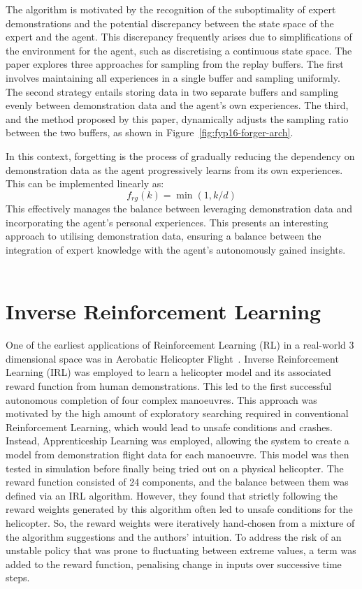 The algorithm is motivated by the recognition of the suboptimality of expert demonstrations and the potential discrepancy between the state space of the expert and the agent.
This discrepancy frequently arises due to simplifications of the environment for the agent, such as discretising a continuous state space.
The paper explores three approaches for sampling from the replay buffers.
The first involves maintaining all experiences in a single buffer and sampling uniformly.
The second strategy entails storing data in two separate buffers and sampling evenly between demonstration data and the agent's own experiences.
The third, and the method proposed by this paper, dynamically adjusts the sampling ratio between the two buffers, as shown in Figure~\ref{fig:fyp16-forger-arch}.

In this context, forgetting is the process of gradually reducing the dependency on demonstration data as the agent progressively learns from its own experiences.
This can be implemented linearly as: 
\[f_{rg}(k) = \min(1, k/d)\]
This effectively manages the balance between leveraging demonstration data and incorporating the agent's personal experiences.
This presents an interesting approach to utilising demonstration data, ensuring a balance between the integration of expert knowledge with the agent's autonomously gained insights. \\\\

\section{Inverse Reinforcement Learning}
One of the earliest applications of Reinforcement Learning (RL) in a real-world 3 dimensional space was in Aerobatic Helicopter Flight~\cite{abbeelRLAerobaticFlight}.
Inverse Reinforcement Learning (IRL) was employed to learn a helicopter model and its associated reward function from human demonstrations.
This led to the first successful autonomous completion of four complex manoeuvres.
This approach was motivated by the high amount of exploratory searching required in conventional Reinforcement Learning, which would lead to unsafe conditions and crashes.
Instead, Apprenticeship Learning was employed, allowing the system to create a model from demonstration flight data for each manoeuvre.
This model was then tested in simulation before finally being tried out on a physical helicopter.
The reward function consisted of 24 components, and the balance between them was defined via an IRL algorithm.
However, they found that strictly following the reward weights generated by this algorithm often led to unsafe conditions for the helicopter.
So, the reward weights were iteratively hand-chosen from a mixture of the algorithm suggestions and the authors' intuition. 
To address the risk of an unstable policy that was prone to fluctuating between extreme values, a term was added to the reward function, penalising change in inputs over successive time steps.

